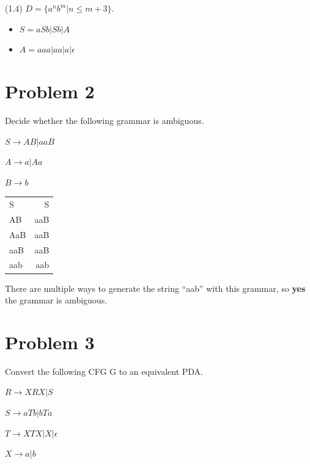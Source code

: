 \documentclass[11pt]{article}
\begin{document}
(1.4) $D=\{a^nb^m|n\leq m+3\}$.

\begin{itemize}
\item $S = aSb | Sb | A $
\item $A = aaa | aa | a | \epsilon$

\end{itemize}



\newpage
\section*{Problem 2}

\noindent
Decide whether the following grammar is ambiguous.
\newline

$S\rightarrow AB|aaB$

$A\rightarrow a|Aa$

$B\rightarrow b$


\begin{table}[h!]
\begin{tabular}{l r}
S & S\\
AB & aaB\\
AaB & aaB\\
aaB & aaB\\
aab & aab\\
\end{tabular}

\end{table}


There are multiple ways to generate the string ``aab'' with this grammar, so \textbf{yes} the grammar is ambiguous.

\newpage
\section*{Problem 3}

\noindent
Convert the following CFG G to an equivalent PDA.

$R\rightarrow XRX|S$

$S\rightarrow aTb|bTa$

$T\rightarrow XTX|X|\epsilon$

$X\rightarrow a|b$
\end{document}
